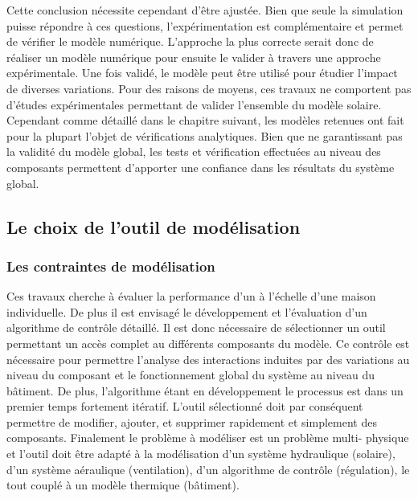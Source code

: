 Cette conclusion nécessite cependant d’être ajustée. Bien que seule la simulation puisse
répondre à ces questions, l’expérimentation est complémentaire et permet de vérifier le
modèle numérique. L’approche la plus correcte serait donc de réaliser un modèle numérique
pour ensuite le valider à travers une approche expérimentale. Une fois validé, le modèle
peut être utilisé pour étudier l’impact de diverses variations. Pour des raisons de
moyens, ces travaux ne comportent pas d’études expérimentales permettant de valider
l’ensemble du modèle solaire. Cependant comme détaillé dans le chapitre suivant, les
modèles retenues ont fait pour la plupart l’objet de vérifications analytiques. Bien que
ne garantissant pas la validité du modèle global, les tests et vérification effectuées au
niveau des composants permettent d’apporter une confiance dans les résultats du système global.



\subsection{Le choix de l’outil de modélisation} %
\label{sub:le_choix_de_l_outil_de_modelisation}
\subsubsection{Les contraintes de modélisation} %
\label{ssub:les_contraintes_de_modelisation}
Ces travaux cherche à évaluer la performance d’un  à l’échelle d’une maison
individuelle. De plus il est envisagé le développement et l’évaluation d’un algorithme de
contrôle détaillé. Il est donc nécessaire de sélectionner un outil permettant un accès
complet au différents composants du modèle. Ce contrôle est nécessaire pour permettre
l’analyse des interactions induites par des variations au niveau du composant et le
fonctionnement global du système au niveau du bâtiment. De plus, l’algorithme étant en
développement le processus est dans un premier temps fortement itératif. L’outil
sélectionné doit par conséquent permettre de modifier, ajouter, et supprimer rapidement et
simplement des composants. Finalement le problème à modéliser est un problème multi-
physique et l’outil doit être adapté à la modélisation d’un système hydraulique (solaire),
d’un système aéraulique (ventilation), d’un algorithme de contrôle (régulation), le tout
couplé à un modèle thermique (bâtiment).


